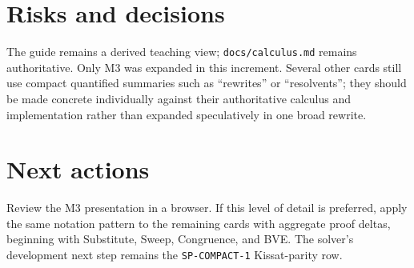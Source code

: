 \documentclass[11pt]{article}
\begin{document}
\section{Risks and decisions}
The guide remains a derived teaching view; \texttt{docs/calculus.md} remains
authoritative.  Only M3 was expanded in this increment.  Several other cards
still use compact quantified summaries such as ``rewrites'' or ``resolvents'';
they should be made concrete individually against their authoritative calculus
and implementation rather than expanded speculatively in one broad rewrite.

\section{Next actions}
Review the M3 presentation in a browser.  If this level of detail is preferred,
apply the same notation pattern to the remaining cards with aggregate proof
deltas, beginning with Substitute, Sweep, Congruence, and BVE.  The solver's
development next step remains the \texttt{SP-COMPACT-1} Kissat-parity row.
\end{document}
